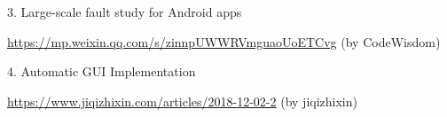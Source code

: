 \documentclass[a4paper]{article}
\begin{document}
{ 3. Large-scale fault study for Android apps
 
 \url{https://mp.weixin.qq.com/s/zinnpUWWRVmguaoUoETCvg} (by CodeWisdom)
 
 4. Automatic GUI Implementation
 
 \url{https://www.jiqizhixin.com/articles/2018-12-02-2} (by jiqizhixin)

%
%
}
\end{document}
